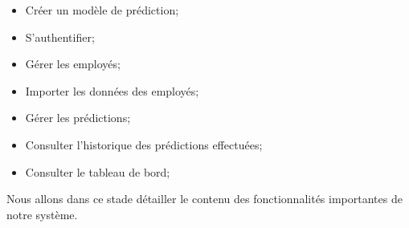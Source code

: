        \begin{itemize}
    \item Créer un modèle de prédiction;
    \item S'authentifier;
    \item Gérer les employés;
     \item Importer les données des employés;
      \item Gérer les prédictions;
      \item Consulter l'historique des prédictions effectuées;
      \item Consulter le tableau de bord;
      


      
    \end{itemize}
    Nous allons dans ce stade détailler le contenu des fonctionnalités importantes de notre système.
       
